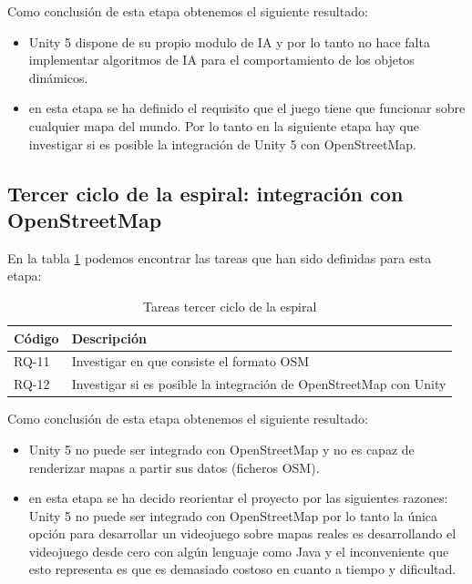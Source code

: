 Como conclusión de esta etapa obtenemos el siguiente resultado:
\begin{itemize}
	\item Unity 5 dispone de su propio modulo de IA y por lo tanto no hace falta implementar algoritmos de IA para el comportamiento de los objetos dinámicos.
	\item en esta etapa se ha definido el requisito que el juego tiene que funcionar sobre cualquier mapa del mundo. Por lo tanto en la siguiente etapa hay que investigar si es posible la integración de Unity 5 con OpenStreetMap.
\end{itemize}

\subsection{Tercer ciclo de la espiral: integración con OpenStreetMap}

En la tabla \ref{tabla:requisitosEtapa3} podemos encontrar las tareas que han sido definidas para esta etapa:

\begin{table}[H]
\begin{center}
\begin{tabular}{|p{1.5cm}| p{10.5cm}|}
\hline 
Código & Descripción \\
\hline \hline
RQ-11 & Investigar en que consiste el formato OSM\\ \hline
RQ-12 & Investigar si es posible la integración de OpenStreetMap con Unity\\ \hline
\end{tabular}
\caption{Tareas tercer ciclo de la espiral}
\label{tabla:requisitosEtapa3}
\end{center}
\end{table}

Como conclusión de esta etapa obtenemos el siguiente resultado:
\begin{itemize}
	\item Unity 5 no puede ser integrado con OpenStreetMap y no es capaz de renderizar mapas a partir sus datos (ficheros OSM). 
	\item en esta etapa se ha decido reorientar el proyecto por las siguientes razones: Unity 5 no puede ser integrado con OpenStreetMap por lo tanto la única opción para desarrollar un videojuego sobre mapas reales es desarrollando el videojuego desde cero con algún lenguaje como Java y el inconveniente que esto representa es que es demasiado costoso en cuanto a tiempo y dificultad.  
\end{itemize}

